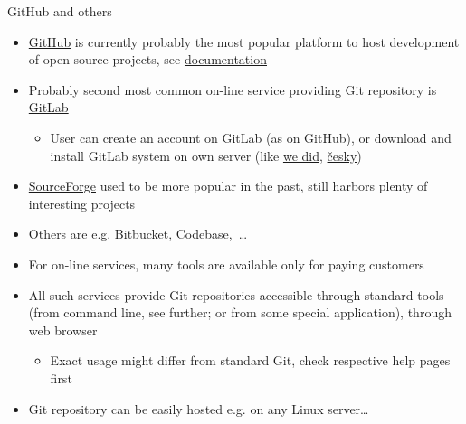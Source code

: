 \documentclass[compress, ucs, xelatex, 11pt, xcolor=svgnames, aspectratio=169,
	hyperref={
		bookmarks=true,
		unicode=true,
		colorlinks=true,
		pdftitle={Linux, command line and MetaCentrum},
		plainpages=false,
		pdfauthor={Vojtech Zeisek},
		pdfsubject={Course about use of Linux command line, writing shell scripts and using MetaCentrum of CESNET},
		pdfcreator={XeLaTeX},
		pdfkeywords={Linux, GNU, BASH, shell, command line, MetaCentrum},
		linkcolor=DarkRed, %
		anchorcolor=DarkBlue, %
		citecolor=Indigo, %
		filecolor=NavyBlue, %
		menucolor=DarkMagenta, %
		urlcolor=DarkBlue, %
		pdftex},
	url={hyphens, lowtilde} %
	]{beamer}
\begin{document}
\begin{frame}{GitHub and others}
	\begin{itemize}
		\item \href{https://github.com/}{GitHub} is currently probably the most popular platform to host development of open-source projects, see \href{https://support.github.com/}{documentation}
		\item Probably second most common on-line service providing Git repository is \href{https://about.gitlab.com/}{GitLab}
		\begin{itemize}
			\item User can create an account on GitLab (as on GitHub), or download and install GitLab system on own server (like \href{https://sorbus.ibot.cas.cz/en/gitlab}{we did}, \href{https://sorbus.ibot.cas.cz/cs/gitlab}{česky})
		\end{itemize}
		\item \href{https://sourceforge.net/}{SourceForge} used to be more popular in the past, still harbors plenty of interesting projects
		\item Others are e.g. \href{https://bitbucket.org/}{Bitbucket}, \href{https://www.codebasehq.com/}{Codebase},~\ldots
		\item For on-line services, many tools are available only for paying customers
		\item All such services provide Git repositories accessible through standard tools (from command line, see further; or from some special application), through web browser
		\begin{itemize}
			\item Exact usage might differ from standard Git, check respective help pages first
		\end{itemize}
		\item Git repository can be easily hosted e.g. on any Linux server\ldots
	\end{itemize}
\end{frame}
\end{document}
